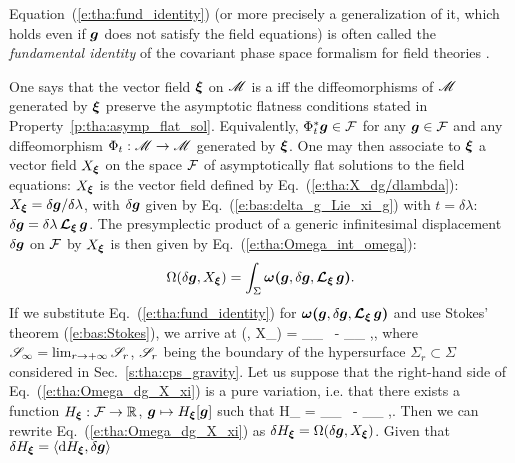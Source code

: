 \begin{remark}
Equation~(\ref{e:tha:fund_identity}) (or more precisely a generalization of it, which holds
even if $\bm{g}$ does not satisfy the field equations) is often called
the \emph{fundamental identity} of the covariant phase space formalism for field theories
\cite{HollaW13,HollaWZ24,Compe19,GrumiS22,HajiaS16}.
\end{remark}

One says that the vector field $\bm{\xi}$ on $\mathscr{M}$ is a
iff the diffeomorphisms of $\mathscr{M}$ generated
by $\bm{\xi}$ preserve the asymptotic flatness conditions stated in Property~\ref{p:tha:asymp_flat_sol}.
Equivalently, $\Phi_t^*\bm{g}\in \mathcal{F}$ for any $\bm{g}\in\mathcal{F}$ and any diffeomorphism
$\Phi_t:\mathscr{M} \to \mathscr{M}$ generated by $\bm{\xi}$.
One may then associate to $\bm{\xi}$ a vector field
$X_{\bm{\xi}}$ on the space $\mathcal{F}$ of
asymptotically flat solutions to the field equations: $X_{\bm{\xi}}$ is the
vector field defined by Eq.~(\ref{e:tha:X_dg/dlambda}):
$X_{\bm{\xi}} = \delta\bm{g} / \delta\lambda$, with $\delta\bm{g}$ given
by Eq.~(\ref{e:bas:delta_g_Lie_xi_g}) with $t=\delta\lambda$: $\delta\bm{g} = \delta\lambda\, \bm{\mathcal{L}}_{\bm{\xi}}\, \bm{g}$.
The presymplectic product of a generic infinitesimal displacement $\delta\bm{g}$ on
$\mathcal{F}$ by $X_{\bm{\xi}}$ is then given by Eq.~(\ref{e:tha:Omega_int_omega}):
\[
    \Omega(\delta\bm{g}, X_{\bm{\xi}}) =
        \int_{\Sigma} \bm{\omega} \textbf{(}\bm{g},\delta\bm{g},\bm{\mathcal{L}}_{\bm{\xi}}\,\bm{g}\textbf{)} .
\]
If we substitute Eq.~(\ref{e:tha:fund_identity}) for $\bm{\omega} \textbf{(}\bm{g},\delta\bm{g},\bm{\mathcal{L}}_{\bm{\xi}}\,\bm{g}\textbf{)}$ and use Stokes' theorem (\ref{e:bas:Stokes}), we arrive at
\be \label{e:tha:Omega_dg_X_xi}
    \Omega(\delta{}, X_{\w{\xi}}) =
       \delta \int_{\Sp_\infty}\!\! \lld\w{\xi}\rld
    \ -  \int_{\Sp_\infty} \!\! \w{\xi}\cdot\w{\theta}\lld{},\delta{}\rld ,
\ee
where $\mathscr{S}_\infty = \lim_{r\to +\infty} \mathscr{S}_r$, $\mathscr{S}_r$ being the boundary
of the hypersurface $\Sigma_r \subset \Sigma$ considered in Sec.~\ref{s:tha:cps_gravity}.
Let us suppose that the right-hand side of Eq.~(\ref{e:tha:Omega_dg_X_xi}) is a
pure variation, i.e. that there exists a function $H_{\bm{\xi}}: \mathcal{F} \to \mathbb{R}$,
$\bm{g}\mapsto H_{\bm{\xi}}[\bm{g}]$ such that
\be \label{e:tha:delta_H_xi}
    \delta H_{\w{\xi}} = \delta \int_{\Sp_\infty}\!\! \lld\w{\xi}\rld
    \ -  \int_{\Sp_\infty} \!\! \w{\xi}\cdot\w{\theta}\lld{},\delta{}\rld .
\ee
Then we can rewrite Eq.~(\ref{e:tha:Omega_dg_X_xi}) as
$\delta H_{\bm{\xi}} = \Omega(\delta\bm{g}, X_{\bm{\xi}})$.
Given that
$\delta H_{\bm{\xi}} = \langle \mathrm{d} H_{\bm{\xi}}, \delta\bm{g} \rangle$
